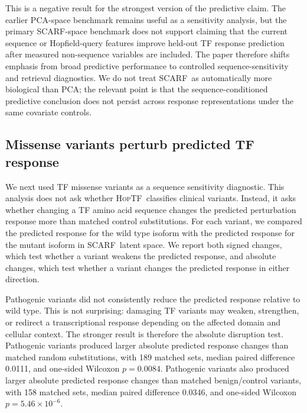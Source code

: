 \documentclass[11pt]{article}
\newcommand{\hoptf}{\textsc{HopTF}}
\newcommand{\scarf}{\textsc{SCARF}}
\begin{document}
This is a negative result for the strongest version of the predictive claim. The earlier PCA-space benchmark remains useful as a sensitivity analysis, but the primary \scarf-space benchmark does not support claiming that the current sequence or Hopfield-query features improve held-out TF response prediction after measured non-sequence variables are included. The paper therefore shifts emphasis from broad predictive performance to controlled sequence-sensitivity and retrieval diagnostics. We do not treat \scarf\ as automatically more biological than PCA; the relevant point is that the sequence-conditioned predictive conclusion does not persist across response representations under the same covariate controls.

\subsection{Missense variants perturb predicted TF response}

We next used TF missense variants as a sequence sensitivity diagnostic. This analysis does not ask whether \hoptf\ classifies clinical variants. Instead, it asks whether changing a TF amino acid sequence changes the predicted perturbation response more than matched control substitutions. For each variant, we compared the predicted response for the wild type isoform with the predicted response for the mutant isoform in \scarf\ latent space. We report both signed changes, which test whether a variant weakens the predicted response, and absolute changes, which test whether a variant changes the predicted response in either direction.

Pathogenic variants did not consistently reduce the predicted response relative to wild type. This is not surprising: damaging TF variants may weaken, strengthen, or redirect a transcriptional response depending on the affected domain and cellular context. The stronger result is therefore the absolute disruption test. Pathogenic variants produced larger absolute predicted response changes than matched random substitutions, with 189 matched sets, median paired difference 0.0111, and one-sided Wilcoxon \(p=0.0084\). Pathogenic variants also produced larger absolute predicted response changes than matched benign/control variants, with 158 matched sets, median paired difference 0.0346, and one-sided Wilcoxon \(p=5.46\times 10^{-6}\).
\end{document}
